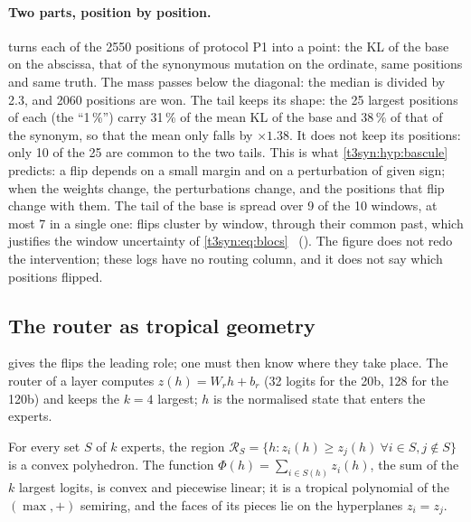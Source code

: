 \paragraph{Two parts, position by position.}  turns each of the \num{2550} positions of protocol P1 into a point: the KL of the base on the abscissa, that of the synonymous mutation on the ordinate, same positions and same truth. The mass passes below the diagonal: the median is divided by 2.3, and \num{2060} positions are won. The tail keeps its shape: the 25 largest positions of each (the ``1\,\%'') carry 31\,\% of the mean KL of the base and 38\,\% of that of the synonym, so that the mean only falls by $\times 1.38$. It does not keep its positions: only 10 of the 25 are common to the two tails. This is what \cref{t3syn:hyp:bascule} predicts: a flip depends on a small margin and on a perturbation of given sign; when the weights change, the perturbations change, and the positions that flip change with them. The tail of the base is spread over 9 of the 10 windows, at most 7 in a single one: flips cluster by window, through their common past, which justifies the window uncertainty of \cref{t3syn:eq:blocs} \mes~(). The figure does not redo the intervention; these logs have no routing column, and it does not say which positions flipped.

\subsection{The router as tropical geometry}\label{t3syn:sec:tropical}

 gives the flips the leading role; one must then know where they take place. The router of a layer computes $z(h) = W_r h + b_r$ (32 logits for the 20b, 128 for the 120b) and keeps the $k = 4$ largest; $h$ is the normalised state that enters the experts.

\begin{proposition}\label{t3syn:prop:polyedres}
For every set $S$ of $k$ experts, the region $\mathcal{R}_S = \{h : z_i(h) \ge z_j(h)\ \forall i \in S, j \notin S\}$ is a convex polyhedron. The function $\Phi(h) = \sum_{i \in S(h)} z_i(h)$, the sum of the $k$ largest logits, is convex and piecewise linear; it is a tropical polynomial of the $(\max, +)$ semiring, and the faces of its pieces lie on the hyperplanes $z_i = z_j$.
\end{proposition}

